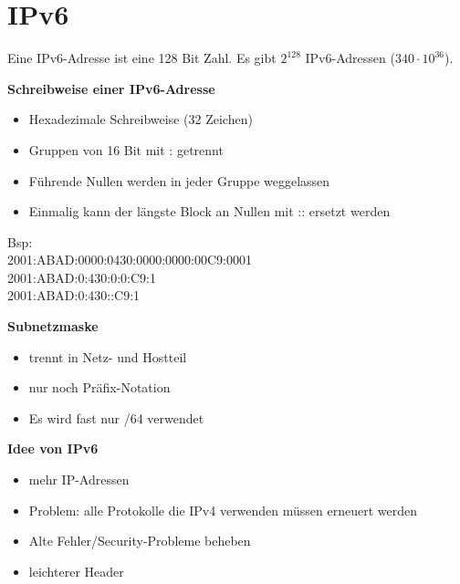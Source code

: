 \chapter{IPv6}
Eine IPv6-Adresse ist eine 128 Bit Zahl. Es gibt $2^{128}$ IPv6-Adressen ($340\cdot10^{36}$).

\textbf{Schreibweise einer IPv6-Adresse} \\
\begin{itemize}
	\item Hexadezimale Schreibweise (32 Zeichen)
	\item Gruppen von 16 Bit mit : getrennt
	\item Führende Nullen werden in jeder Gruppe weggelassen
	\item Einmalig kann der längste Block an Nullen mit :: ersetzt werden
\end{itemize}

Bsp: \\
2001:ABAD:0000:0430:0000:0000:00C9:0001 \\
2001:ABAD:0:430:0:0:C9:1 \\
2001:ABAD:0:430::C9:1

\textbf{Subnetzmaske} \\
\begin{itemize}
	\item trennt in Netz- und Hostteil 
	\item nur noch Präfix-Notation
	\item Es wird fast nur /64 verwendet
\end{itemize}

\textbf{Idee von IPv6}
\begin{itemize}
	\item mehr IP-Adressen
	\item Problem: alle Protokolle die IPv4 verwenden müssen erneuert werden
	\item Alte Fehler/Security-Probleme beheben
	\item leichterer Header
\end{itemize}

